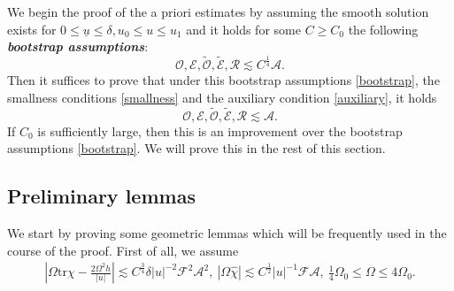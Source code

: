 \documentclass[11pt,reqno]{amsart}
\theoremstyle{definition}
\numberwithin{equation}{section}
\newcommand{\tr}{\mathrm{tr}}
\def\chih{\widehat{\chi}}
\def\tr{\mathrm{tr}}
\def\ub{\underline{u}}
\begin{document}
We begin the proof of the a priori estimates by assuming the smooth solution exists for $0\le\ub\le\delta, u_0\le u\le u_1$ and it holds for some $C\ge C_0$ the following {\bf{\emph{bootstrap assumptions}}}:
\begin{equation}\label{bootstrap}\mathcal{O}, \mathcal{E}, \widetilde{\mathcal{O}}, \widetilde{\mathcal{E}}, \mathcal{R}\lesssim C^{\frac{1}{4}}\mathcal{A}.\end{equation} 
Then it suffices to prove that under this bootstrap assumptions \eqref{bootstrap}, the smallness conditions \eqref{smallness} and the auxiliary condition \eqref{auxiliary}, it holds
$$\mathcal{O}, \mathcal{E}, \widetilde{\mathcal{O}}, \widetilde{\mathcal{E}}, \mathcal{R}\lesssim \mathcal{A}.$$
If $C_0$ is sufficiently large, then this is an improvement over the bootstrap assumptions \eqref{bootstrap}. We will prove this in the rest of this section.


\subsection{Preliminary lemmas}
We start by proving some geometric lemmas which will be frequently used in the course of the proof. First of all, we assume
\begin{align}\label{bootstrap-geometric}
\left|\Omega\tr\chi-\frac{2\Omega^2h}{|u|}\right|\lesssim C^{\frac{3}{4}}\delta|u|^{-2}\mathscr{F}^2\mathcal{A}^2,\ |\Omega\chih|\lesssim C^{\frac{1}{2}}|u|^{-1}\mathscr{F}\mathcal{A},\ \frac{1}{4}\Omega_0\le\Omega\le 4\Omega_0.
\end{align}
\end{document}
